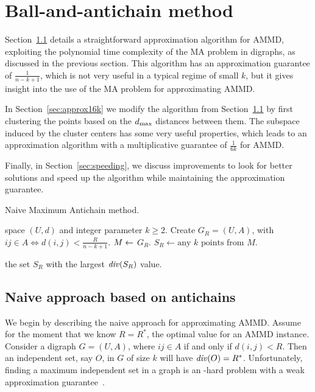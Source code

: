 \section{Ball-and-antichain method}
\label{sec:approx}
Section~\ref{sec:approxnk2} details a straightforward approximation algorithm for AMMD, exploiting the polynomial time complexity of the MA problem in digraphs, as discussed in the previous section.
This algorithm has an approximation guarantee of $\frac{1}{n-k+1}$, which is not very useful in a typical regime of small $k$, but it gives insight into the use of the MA problem for approximating AMMD.

In Section~\ref{sec:approx16k} we modify the algorithm from Section~\ref{sec:approxnk2} by first clustering the points based on the $d_{\text{max}}$ distances between them. The subspace induced by the cluster centers has some very useful properties, which leads to an approximation algorithm with a multiplicative guarantee of $\frac{1}{6k}$ for AMMD.

Finally, in Section~\ref{sec:speeding}, we discuss improvements to look for better solutions and speed up the algorithm while maintaining the approximation guarantee.

\begin{algorithm}[t]
\caption{Naive Maximum Antichain method.}
\label{algo:app_ma}
\begin{algorithmic}[1]
\Require space $(U, d)$ and integer parameter $k\geq 2$.
	\State Create $G_R = (U,A)$, with $ij \in A \Leftrightarrow d(i,j)<\frac{R}{n-k+1}$. \label{line:naive_create_G}
	\State $M \leftarrow$  $G_R$.
	 $S_R \leftarrow \text{any }k \text{ points from } M$.

	\EndIf
\EndFor
\Ensure the set $S_R$ with the largest $\diver{S_R}$ value. 
\end{algorithmic}
\end{algorithm}

\subsection{Naive approach based on antichains}
\label{sec:approxnk2}

We begin by describing the naive approach for approximating AMMD.
Assume for the moment that we know $R = R^*$, the optimal value for an AMMD instance.
Consider a digraph $G = (U, A)$, where $ij \in A$ if and only if $d(i, j) < R$.
Then an independent set, say $O$, in $G$ of size $k$ will have $\diver{O} = R^*$.
Unfortunately, finding a maximum independent set in a graph is an \NP-hard problem with a weak approximation guarantee~\cite{hastad1996clique}.

